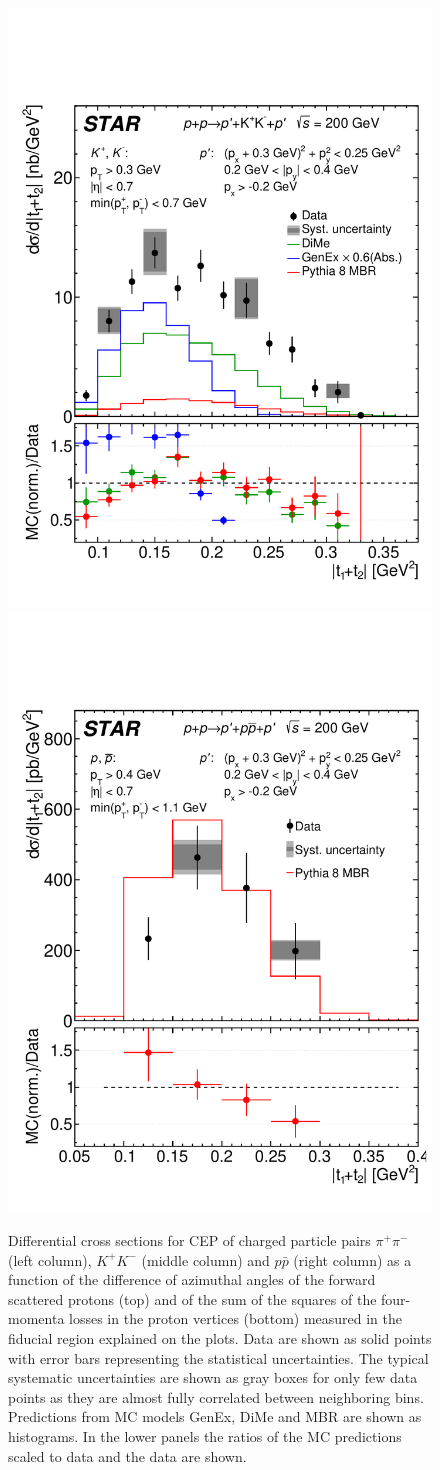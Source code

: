 \begin{figure}[bh]
\hfill
\includegraphics[width=.31\textwidth,page=1]{graphics/physicsResults/Ratio_FinalResult_MandelstamTSum_kaon.pdf}
\hfill
\includegraphics[width=.31\textwidth,page=1]{graphics/physicsResults/Ratio_FinalResult_MandelstamTSum_proton.pdf}
%
\caption{Differential cross sections for CEP of charged particle pairs $\pi^+\pi^-$ (left column), $K^+K^-$ (middle column) and $p\bar{p}$ (right column) as a function of the difference of azimuthal angles of the forward scattered protons (top) and of the sum of the squares of the four-momenta losses in the proton vertices (bottom) measured in the fiducial region explained on the plots. Data are shown as solid points with error bars representing the statistical uncertainties. The typical systematic uncertainties are shown as gray boxes for only few data points as they are almost fully correlated between neighboring bins. Predictions from MC models GenEx, DiMe and MBR are shown as histograms. In the lower panels the ratios of the MC predictions scaled to data and the data are shown.}
\label{results_2}
\end{figure}
%
